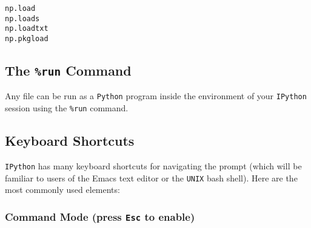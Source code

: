 \documentclass{article}
\begin{document}
    \begin{verbatim}
np.load
np.loads
np.loadtxt
np.pkgload
\end{verbatim}

    \subsection{The \texttt{\%run} Command}\label{the-run-command}

Any file can be run as a \texttt{Python} program inside the environment
of your \texttt{IPython} session using the \texttt{\%run} command.

    \subsection{Keyboard Shortcuts}\label{keyboard-shortcuts}

\texttt{IPython} has many keyboard shortcuts for navigating the prompt
(which will be familiar to users of the Emacs text editor or the
\texttt{UNIX} bash shell). Here are the most commonly used elements:

\subsubsection{Command Mode (press \texttt{Esc} to
enable)}\label{command-mode-press-esc-to-enable}
\end{document}
